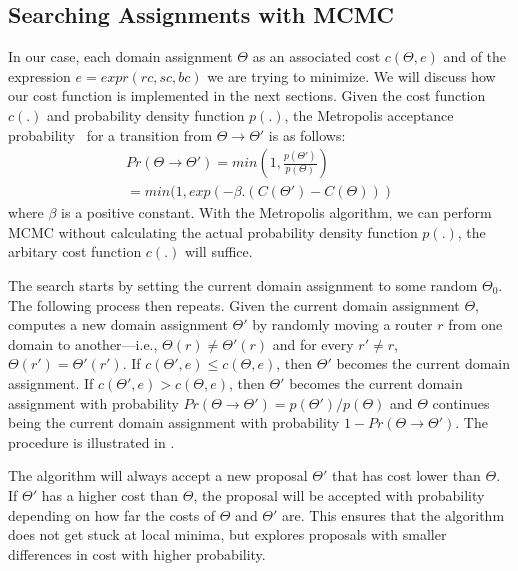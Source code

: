 \subsection{Searching Assignments with MCMC}
In our case, each domain assignment $\Theta$
as an associated cost $c(\Theta, e)$
and of the expression 
$e=expr(rc, sc, bc)$
we are trying to minimize.
We will discuss how our cost function is implemented in the next sections.
Given the cost function $c(.)$ and probability density 
function $p(.)$, 
the Metropolis acceptance probability~\cite{metropolis}
for a transition from $\Theta \rightarrow \Theta'$ is as follows:
\begin{multline}
Pr(\Theta \rightarrow \Theta') = min(1, \frac{p(\Theta')}{p(\Theta)}) \\
= min(1, exp(-\beta.(C(\Theta') - C(\Theta)))
\end{multline}
where $\beta$ is a positive constant. With the Metropolis
algorithm, we can perform MCMC without calculating the actual
probability density function $p(.)$, the arbitary cost function $c(.)$
will suffice.

The search starts by setting the current domain assignment 
to some random $\Theta_0$.
The following process then repeats.
Given the current domain
assignment $\Theta$, 
computes a new domain assignment $\Theta'$ by randomly
moving a router $r$ from one domain to another---i.e., $\Theta(r)\neq \Theta'(r)$ and
for every $r'\neq r$, $\Theta(r')= \Theta'(r')$.
If $c(\Theta',e)\leq c(\Theta,e)$, then $\Theta'$ becomes the current domain assignment.
If $c(\Theta',e)>c(\Theta,e)$, then $\Theta'$ becomes the current domain assignment
with probability $Pr(\Theta \rightarrow \Theta')=p(\Theta')/p(\Theta)$ and 
 $\Theta$ continues being the current domain assignment with probability $1-Pr(\Theta \rightarrow \Theta')$.
\iffull
The procedure is illustrated in .
\fi

The algorithm will always accept a new proposal $\Theta'$
that has cost lower than $\Theta$. If $\Theta'$ has a 
higher cost than $\Theta$, the proposal will be 
accepted with probability depending on 
how far the costs of $\Theta$ and $\Theta'$ are. This ensures that 
the algorithm does not get stuck at local minima, but 
explores proposals with smaller differences in cost with 
higher probability.

